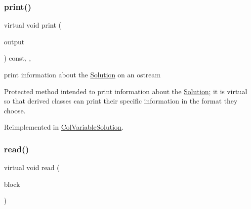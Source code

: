 \mbox{\label{class_s_m_spp__di__unipi__it_1_1_solution_a2e7b9c9148a98c5c342e8c25cac95926}} 
\subsubsection{\texorpdfstring{print()}{print()}}
{\footnotesize\ttfamily virtual void print (\begin{DoxyParamCaption}\item[{std\+::ostream \&}]{output }\end{DoxyParamCaption}) const\hspace{0.3cm}{\ttfamily [inline]}, {\ttfamily [protected]}, {\ttfamily [virtual]}}



print information about the \mbox{\hyperlink{class_s_m_spp__di__unipi__it_1_1_solution}{Solution}} on an ostream 

Protected method intended to print information about the \mbox{\hyperlink{class_s_m_spp__di__unipi__it_1_1_solution}{Solution}}; it is virtual so that derived classes can print their specific information in the format they choose. 

Reimplemented in \mbox{\hyperlink{class_s_m_spp__di__unipi__it_1_1_col_variable_solution_a59a9fcbf8f9f86d348344b2073644b0e}{Col\+Variable\+Solution}}.

\mbox{\label{class_s_m_spp__di__unipi__it_1_1_solution_ae22668fc6d3d5794e6a881953898aa6b}} 
\subsubsection{\texorpdfstring{read()}{read()}}
{\footnotesize\ttfamily virtual void read (\begin{DoxyParamCaption}\item[{const \mbox{\hyperlink{class_s_m_spp__di__unipi__it_1_1_block}{Block}} $\ast$const}]{block }\end{DoxyParamCaption})\hspace{0.3cm}{\ttfamily [pure virtual]}}



